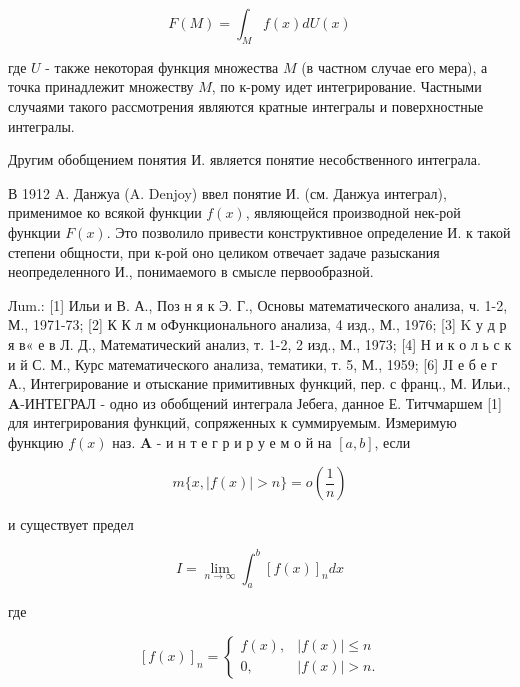\documentclass[10pt]{article}
\begin{document}
\[

F(M)=\int_{M} f(x) d U(x)

\]



где $U$ - также некоторая функция множества $M$ (в частном случае его мера), а точка принадлежит множеству $M$, по к-рому идет интегрирование. Частными случаями такого рассмотрения являются кратные интегралы и поверхностные интегралы.



Другим обобщением понятия И. является понятие несобственного интеграла.



В 1912 A. Данжуа (A. Denjoy) ввел понятие И. (см. Данжуа интеграл), применимое ко всякой функции $f(x)$, являющейся производной нек-рой функции $F(x)$. Это позволило привести конструктивное определение И. к такой степени общности, при к-рой оно целиком отвечает задаче разыскания неопределенного И., понимаемого в смысле первообразной.



Лum.: [1] Ильи и В. А., Поз н я к Э. Г., Основы математического анализа, ч. 1-2, М., 1971-73; [2] К К л м оФункционального анализа, 4 изд., М., 1976; [3] K у д р я в« е в Л. Д., Математический анализ, т. 1-2, 2 изд., М., 1973; [4] Н и к о л ь с к и й С. М., Курс математического анализа, тематики, т. 5, М., 1959; [6] ЈI е б е г А., Интегрирование и отыскание примитивных функций, пер. с франц., М. Ильи., $\boldsymbol{A}$-ИНТЕГРАЛ - одно из обобщений интеграла Јебега, данное Е. Титчмаршем [1] для интегрирования функций, сопряженных к суммируемым. Измеримую функцию $f(x)$ наз. $\boldsymbol{A}$ - и н т е г р и р у е м о й на $[a, b]$, если



\[

m\{x,|f(x)|>n\}=o\left(\frac{1}{n}\right)

\]



и существует предел



\[

I=\lim _{n \rightarrow \infty} \int_{a}^{b}[f(x)]_{n} d x

\]



где



\[

[f(x)]_{n}=\left\{\begin{array}{cl}

f(x), & |f(x)| \leqslant n \\

0, & |f(x)|>n .

\end{array}\right.

\]
\end{document}
